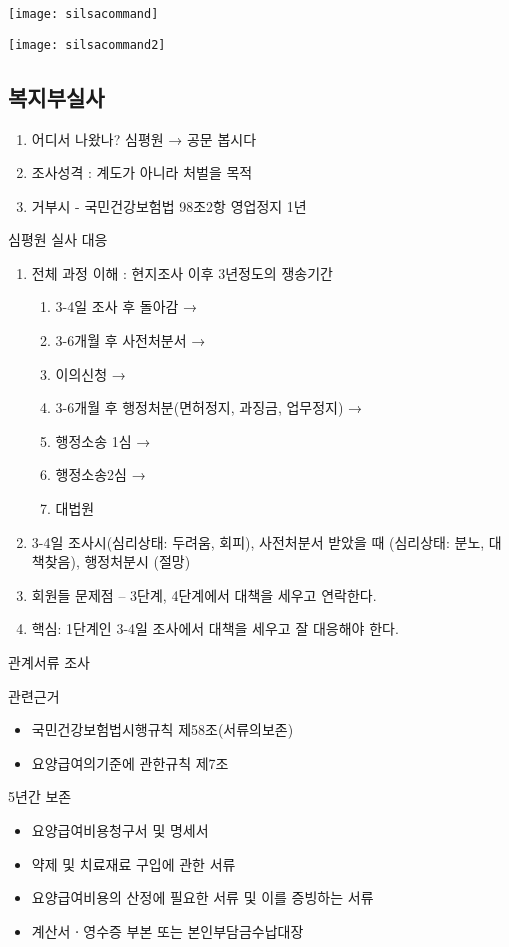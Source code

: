 \texttt{[image: silsacommand]}\par

\texttt{[image: silsacommand2]}

\subsection{복지부실사}
\begin{enumerate}[1.]\tightlist
\item 어디서  나왔나?  심평원 → 공문 봅시다
\item 조사성격 : 계도가 아니라 처벌을 목적
\item 거부시 -  국민건강보험법 98조2항   영업정지 1년
\end{enumerate}
심평원 실사 대응
\begin{enumerate}[1.]\tightlist
\item 전체 과정 이해 : 현지조사 이후 3년정도의 쟁송기간
	\begin{enumerate}[⓵]\tightlist
	\item 3-4일 조사 후 돌아감 →
	\item 3-6개월 후 사전처분서 →
	\item 이의신청 →
	\item 3-6개월 후 행정처분(면허정지, 과징금, 업무정지) →
	\item 행정소송 1심 →
	\item 행정소송2심 →
	\item 대법원 
	\end{enumerate}
\item 3-4일 조사시(심리상태: 두려움, 회피), 사전처분서 받았을 때 (심리상태: 분노, 대책찾음), 행정처분시 (절망)
\item 회원들 문제점 – 3단계, 4단계에서 대책을 세우고 연락한다. 
\item 핵심: 1단계인 3-4일 조사에서 대책을 세우고 잘 대응해야 한다. 
\end{enumerate}
관계서류 조사
\begin{commentbox}{관련근거}
\begin{itemize}\tightlist
\item 국민건강보험법시행규칙 제58조(서류의보존)
\item 요양급여의기준에 관한규칙 제7조
\end{itemize}
\Large{5년간 보존}
\begin{itemize}\tightlist
\item 요양급여비용청구서 및 명세서
\item 약제 및 치료재료 구입에 관한 서류
\item 요양급여비용의 산정에 필요한 서류 및 이를 증빙하는 서류
\item 계산서ㆍ영수증 부본 또는 본인부담금수납대장
\end{itemize}
\end{commentbox}

